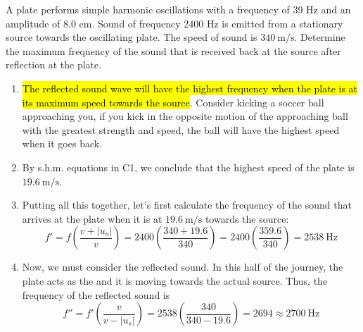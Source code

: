 \documentclass[a4paper,12pt]{article}
\newcommand{\paren}[1]{\left(#1\right)}
\begin{document}
A plate performs simple harmonic oscillations with a frequency of 39 Hz and an amplitude of 8.0 cm. Sound of frequency 2400 Hz is emitted from a stationary source towards the oscillating plate. The speed of sound is $\SI{340}{\meter\per\second}$. Determine the maximum frequency of the sound that is received back at the source after reflection at the plate.
\begin{enumerate}
  \item \hl{The reflected sound wave will have the highest frequency when the plate is at its maximum speed towards the source}. Consider kicking a soccer ball approaching you, if you kick in the opposite motion of the approaching ball with the greatest strength and speed, the ball will have the highest speed when it goes back.
  \item By s.h.m. equations in C1, we conclude that the highest speed of the plate is $\SI{19.6}{\meter\per\second}$.
  \item Putting all this together, let's first calculate the frequency of the sound that arrives at the plate when it is at $\SI{19.6}{\meter\per\second}$ towards the source:
        $$f' = f\paren{\frac{v + |u_o|}{v}} = 2400\paren{\frac{340 + 19.6}{340}} = 2400\paren{\frac{359.6}{340}} = 2538\mathrm{~Hz}$$
  \item Now, we must consider the reflected sound. In this half of the journey, the plate acts as the  and it is moving towards the actual source. Thus, the frequency of the reflected sound is
        $$f'' = f'\paren{\frac{v}{v - |u_s|}} = 2538\paren{\frac{340}{340 - 19.6}} = 2694 \approx 2700 \mathrm{~Hz}$$
\end{enumerate}
\end{document}
